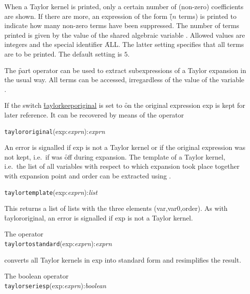 \hypertarget{reserved:TAYLORPRINTTERMS}{}
When a Taylor kernel is printed, only a certain number of (non-zero)
coefficients are shown. If there are more, an expression of the form
\f{($n$ terms)} is printed to indicate how many non-zero
terms have been suppressed. The number of terms printed is given by
the value of the shared algebraic variable .
Allowed values are integers and the special identifier \f{ALL}. The
latter setting specifies that all terms are to be printed. The default
setting is $5$.

%
The \f{part} operator can be used to extract subexpressions of a
Taylor expansion in the usual way. All terms can be accessed,
irregardless of the value of the variable .


If the switch \hyperlink{switch:TAYLORKEEPORIGINAL}{\f{taylorkeeporiginal}}
is set to \f{on} the
original expression exp is kept for later reference.
It can be recovered by means of the operator

\hypertarget{operator:TAYLORORIGINAL}{}
\hspace*{2em} \texttt{taylororiginal}(exp:{\em exprn}):{\em exprn}

An error is signalled if exp is not a Taylor kernel or if the original
expression was not kept, i.e.\ if  was
\f{off} during expansion.  The template of a Taylor kernel, i.e.\
the list of all variables with respect to which expansion took place
together with expansion point and order can be extracted using
.

\hypertarget{operator:TAYLORTEMPLATE}{}
\hspace*{2em} \texttt{taylortemplate}(exp:{\em exprn}):{\em list}

This returns a list of lists with the three elements (var,var0,order).
As with \f{taylororiginal},
an error is signalled if exp is not a Taylor kernel.

The operator
\hypertarget{operator:TAYLORTOSTANDARD}{}\\
\hspace*{2em} \texttt{taylortostandard}(exp:{\em exprn}):{\em exprn}

converts all Taylor kernels in exp into standard form and
 resimplifies the result.

The boolean operator
\hypertarget{operator:TAYLORSERIESP}{}\\
\hspace*{2em} \texttt{taylorseriesp}(exp:{\em exprn}):{\em boolean}

